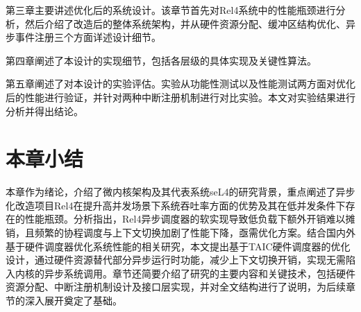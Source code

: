 第三章主要讲述优化后的系统设计。该章节首先对Rel4系统中的性能瓶颈进行分析，然后介绍了改造后的整体系统架构，并从硬件资源分配、缓冲区结构优化、异步事件注册三个方面详述设计细节。

第四章阐述了本设计的实现细节，包括各层级的具体实现及关键性算法。

第五章阐述了对本设计的实验评估。实验从功能性测试以及性能测试两方面对优化后的性能进行验证，并针对两种中断注册机制进行对比实验。本文对实验结果进行分析并得出结论。

\section{本章小结}

本章作为绪论，介绍了微内核架构及其代表系统seL4的研究背景，重点阐述了异步化改造项目Rel4在提升高并发场景下系统吞吐率方面的优势及其在低并发条件下存在的性能瓶颈。分析指出，Rel4异步调度器的软实现导致低负载下额外开销难以摊销，且频繁的协程调度与上下文切换加剧了性能下降，亟需优化方案。结合国内外基于硬件调度器优化系统性能的相关研究，本文提出基于TAIC硬件调度器的优化设计，通过硬件资源替代部分异步运行时功能，减少上下文切换开销，实现无需陷入内核的异步系统调用。章节还简要介绍了研究的主要内容和关键技术，包括硬件资源分配、中断注册机制设计及接口层实现，并对全文结构进行了说明，为后续章节的深入展开奠定了基础。
